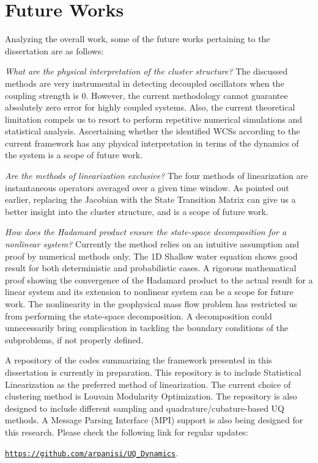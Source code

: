 \section{Future Works}

Analyzing the overall work, some of the future works pertaining to the dissertation are as follows:

\textit{What are the physical interpretation of the cluster structure?} The discussed methods are very instrumental in detecting decoupled oscillators when the coupling strength is 0. However, the current methodology cannot guarantee absolutely zero error for highly coupled systems. Also, the current theoretical limitation compels us to resort to perform repetitive numerical simulations and statistical analysis. Ascertaining whether the identified WCSs according to the current framework has any physical interpretation in terms of the dynamics of the system is a scope of future work. 

\textit{Are the methods of linearization exclusive?} The four methods of linearization are instantaneous operators averaged over a given time window. As pointed out earlier, replacing the Jacobian with the State Transition Matrix can give us a better insight into the cluster structure, and is a scope of future work.  

\textit{How does the Hadamard product ensure the state-space decomposition for a nonlinear system?} Currently the method relies on an intuitive assumption and proof by numerical methods only. The 1D Shallow water equation shows good result for both deterministic and probabilistic cases. A rigorous mathematical proof showing the convergence of the Hadamard product to the actual result for a linear system and its extension to nonlinear system can be a scope for future work. The nonlinearity in the geophysical mass flow problem has restricted us from performing the state-space decomposition. A decomposition could unnecessarily bring complication in tackling the boundary conditions of the subproblems, if not properly defined. 

A repository of the codes summarizing the framework presented in this dissertation is currently in preparation. This repository is to include Statistical Linearization as the preferred method of linearization. The current choice of clustering method is Louvain Modularity Optimization. The repository is also designed to include different sampling and quadrature/cubature-based UQ methods. A Message Parsing Interface (MPI) support is also being designed for this research. Please check the following link for regular updates:
\begin{center}
{\tt \url{https://github.com/arpanisi/UQ_Dynamics}}.
\end{center}


